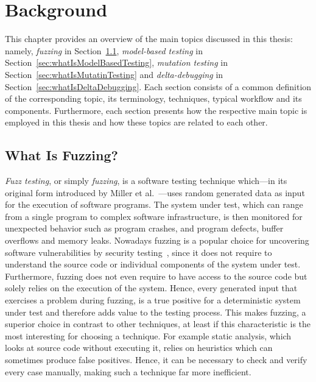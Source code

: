 \chapter{Background}
\label{chapter:background}

This chapter provides an overview of the main topics discussed in this thesis: namely, \emph{fuzzing} in Section~\ref{sec:whatIsFuzzing}, \emph{model-based testing} in Section~\ref{sec:whatIsModelBasedTesting}, \emph{mutation testing} in Section~\ref{sec:whatIsMutatinTesting} and \emph{delta-debugging} in Section~\ref{sec:whatIsDeltaDebugging}. Each section consists of a common definition of the corresponding topic, its terminology, techniques, typical workflow and its components. Furthermore, each section presents how the respective main topic is employed in this thesis and how these topics are related to each other.

\section{What Is Fuzzing?}
\label{sec:whatIsFuzzing}

\emph{Fuzz testing}, or simply \emph{fuzzing}, is a software testing technique which---in its original form introduced by Miller et al.~\cite{miller1995fuzz}---uses random generated data as input for the execution of software programs. The system under test, which can range from a single program to complex software infrastructure, is then monitored for unexpected behavior such as program crashes, and program defects, buffer overflows and memory leaks. Nowadays fuzzing is a popular choice for uncovering software vulnerabilities by security testing~\cite{mcnally2012fuzzing, sutton2007fuzzing, takanen2008fuzzing}, since it does not require to understand the source code or individual components of the system under test. Furthermore, fuzzing does not even require to have access to the source code but solely relies on the execution of the system. Hence, every generated input that exercises a problem during fuzzing, is a true positive for a deterministic system under test and therefore adds value to the testing process. This makes fuzzing, a superior choice in contrast to other techniques, at least if this characteristic is the most interesting for choosing a technique. For example static analysis, which looks at source code without executing it, relies on heuristics which can sometimes produce false positives. Hence, it can be necessary to check and verify every case manually, making such a technique far more inefficient.

